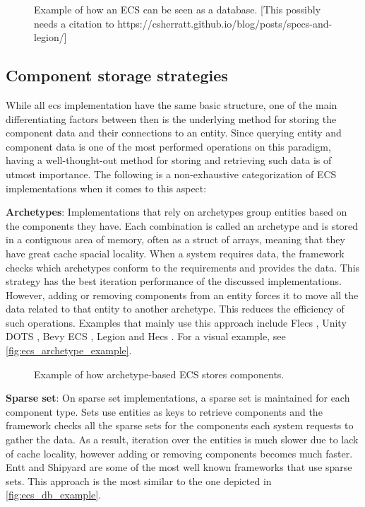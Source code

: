 \documentclass[twoside, 11pt]{article}
\begin{document}
\begin{figure}
  \centering
  
  \caption{Example of how an ECS can be seen as a database. [This possibly needs a citation to https://csherratt.github.io/blog/posts/specs-and-legion/]}
  \label{fig:ecs_db_example}
\end{figure}

\subsection{Component storage strategies}

While all \gls{ecs} implementation have the same basic structure, one of the main differentiating factors between then is the underlying method for storing the component data and their connections to an entity. Since querying entity and component data is one of the most performed operations on this paradigm, having a well-thought-out method for storing and retrieving such data is of utmost importance. The following is a non-exhaustive categorization of ECS implementations when it comes to this aspect:

\textbf{Archetypes}: Implementations that rely on archetypes group entities based on the components they have. Each combination is called an archetype and is stored in a contiguous area of memory, often as a struct of arrays, meaning that they have great cache spacial locality. When a system requires data, the framework checks which archetypes conform to the requirements and provides the data. This strategy has the best iteration performance of the discussed implementations. However, adding or removing components from an entity forces it to move all the data related to that entity to another archetype. This reduces the efficiency of such operations. Examples that mainly use this approach include Flecs \cite{flecs}, Unity DOTS \cite{unityDots}, Bevy ECS \cite{bevy}, Legion \cite{legion} and Hecs \cite{hecs}. For a visual example, see \autoref{fig:ecs_archetype_example}.

\begin{figure}
  \centering
  
  \caption{Example of how archetype-based ECS stores components.}
  \label{fig:ecs_archetype_example}
\end{figure}

\textbf{Sparse set}: On sparse set implementations, a sparse set is maintained for each component type. Sets use entities as keys to retrieve components and the framework checks all the sparse sets for the components each system requests to gather the data. As a result, iteration over the entities is much slower due to lack of cache locality, however adding or removing components becomes much faster. Entt \cite{entt} and Shipyard \cite{shipyard} are some of the most well known frameworks that use sparse sets. This approach is the most similar to the one depicted in \autoref{fig:ecs_db_example}.
\end{document}
